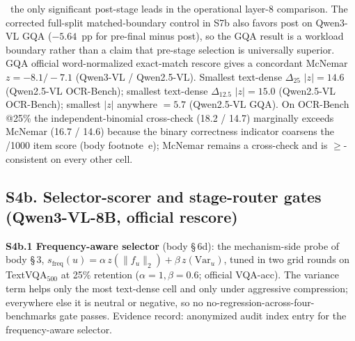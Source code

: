 \documentclass[journal]{IEEEtran}
\begin{document}
\noindent\dag\ the only significant post-stage leads in the operational
layer-8 comparison. The corrected full-split matched-boundary control in S7b
also favors post on Qwen3-VL GQA ($-5.64$~pp for pre-final minus post), so the
GQA result is a workload boundary rather than a claim that pre-stage selection
is universally superior. GQA official
word-normalized exact-match rescore gives a concordant McNemar $z = -8.1 / -7.1$
(Qwen3-VL / Qwen2.5-VL). Smallest text-dense $\Delta_{25}$ $|z| = 14.6$
(Qwen2.5-VL OCR-Bench); smallest text-dense $\Delta_{12.5}$ $|z| = 15.0$
(Qwen2.5-VL OCR-Bench); smallest $|z|$ anywhere $= 5.7$ (Qwen2.5-VL GQA). On
OCR-Bench @25\% the independent-binomial cross-check (18.2 / 14.7) marginally
exceeds McNemar (16.7 / 14.6) because the binary correctness indicator coarsens
the /1000 item score (body footnote~e); McNemar remains a cross-check and is
$\geq$-consistent on every other cell.

\subsection*{S4b. Selector-scorer and stage-router gates (Qwen3-VL-8B, official rescore)}

\noindent\textbf{S4b.1 Frequency-aware selector} (body \S\,6d): the
mechanism-side probe of body \S\,3, $s_{\mathrm{freq}}(u) = \alpha\,
z(\|f_u\|_2) + \beta\, z(\mathrm{Var}_u)$, tuned in two grid rounds on
TextVQA$_{500}$ at 25\% retention ($\alpha{=}1,\beta{=}0.6$; official VQA-acc).
The variance term helps only the most text-dense cell and only under aggressive
compression; everywhere else it is neutral or negative, so no
no-regression-across-four-benchmarks gate passes. Evidence record: anonymized
audit index entry for the frequency-aware selector.
\end{document}
